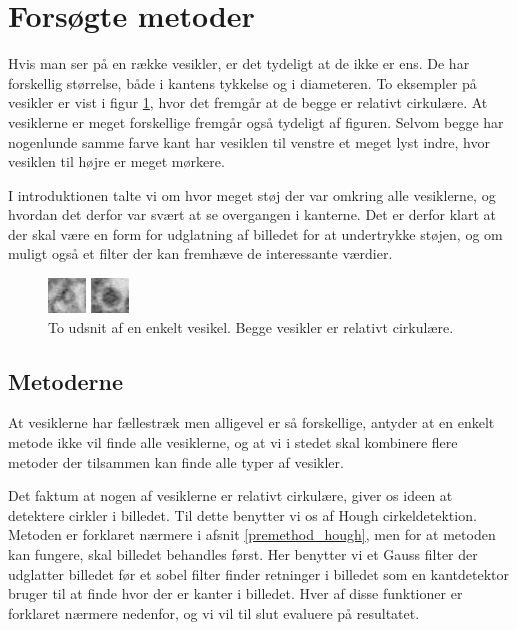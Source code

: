 \section{Forsøgte metoder}
Hvis man ser på en række vesikler, er det tydeligt at de ikke er ens. De har forskellig størrelse, både i kantens tykkelse og i diameteren. To eksempler på vesikler er vist i figur \ref{fig:premethod_ves1}, hvor det fremgår at de begge er relativt cirkulære. At vesiklerne er meget forskellige fremgår også tydeligt af figuren. Selvom begge har nogenlunde samme farve kant har vesiklen til venstre et meget lyst indre, hvor vesiklen til højre er meget mørkere. 

I introduktionen talte vi om hvor meget støj der var omkring alle vesiklerne, og hvordan det derfor var svært at se overgangen i kanterne. Det er derfor klart at der skal være en form for udglatning af billedet for at undertrykke støjen, og om muligt også et filter der kan fremhæve de interessante værdier.

\begin{figure}[H]
	\begin{minipage}[b]{0.5\linewidth}
		\centering
		\includegraphics[scale=5]{files/premethod/img/ves1.png}
	\end{minipage}
	\hspace{0.5cm}
	\begin{minipage}[b]{0.5\linewidth}
		\centering
		\includegraphics[scale=5]{files/premethod/img/ves2.png}
	\end{minipage}
	\caption{To udsnit af en enkelt vesikel. Begge vesikler er relativt cirkulære.\label{fig:premethod_ves1}}
\end{figure}

\subsection{Metoderne}	
At vesiklerne har fællestræk men alligevel er så forskellige, antyder at en enkelt metode ikke vil finde alle vesiklerne, og at vi i stedet skal kombinere flere metoder der tilsammen kan finde alle typer af vesikler.

Det faktum at nogen af vesiklerne er relativt cirkulære, giver os ideen at detektere cirkler i billedet. Til dette benytter vi os af Hough cirkeldetektion. Metoden er forklaret nærmere i afsnit \ref{premethod_hough}, men for at metoden kan fungere, skal billedet behandles først. Her benytter vi et Gauss filter der udglatter billedet før et sobel filter finder retninger i billedet som en kantdetektor bruger til at finde hvor der er kanter i billedet. Hver af disse funktioner er forklaret nærmere nedenfor, og vi vil til slut evaluere på resultatet.

